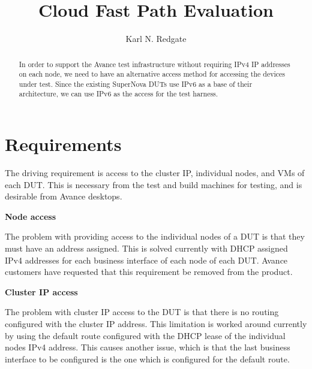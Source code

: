 \documentclass[twoside]{article}
\title{Cloud Fast Path Evaluation}
\author{Karl N. Redgate}
\begin{document}
\maketitle

\begin{abstract}

In order to support the Avance test infrastructure without requiring
IPv4 IP addresses on each node, we need to have an alternative access
method for accessing the devices under test.
Since the existing SuperNova DUTs use IPv6 as a base of their
architecture, we can use IPv6 as the access for the test harness.
\end{abstract}


\section{Requirements}

The driving requirement is access to the cluster IP, individual nodes, and VMs of each DUT.
This is necessary from the test and build machines for testing,
and is desirable from Avance desktops.

{\bf Node access}

The problem with providing access to the individual nodes of a DUT
is that they must have an address assigned.
This is solved currently with DHCP assigned IPv4 addresses for each business
interface of each node of each DUT.
Avance customers have requested that this requirement be removed from the product.

{\bf Cluster IP access}

The problem with cluster IP access to the DUT is that there is no routing
configured with the cluster IP address.
This limitation is worked around currently by using the default route
configured with the DHCP lease of the individual nodes IPv4 address.
This causes another issue, which is that the last business interface
to be configured is the one which is configured for the default route.
\end{document}
